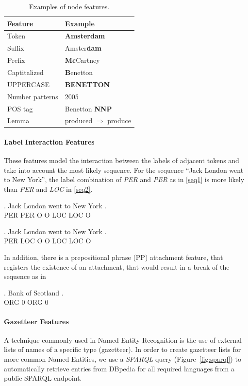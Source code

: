 \documentclass[11pt]{article}
\begin{document}
\begin{table}[h!]
\small
\begin{tabular}{ l l }
\bf Feature & \bf Example \\
\hline
Token &  \textbf{Amsterdam}\\
Suffix& Amster\textbf{dam}\\
Prefix&  \textbf{Mc}Cartney\\
Captitalized& \textbf{B}enetton\\
UPPERCASE &  \textbf{BENETTON}\\
Number patterns & 2005\\
POS tag &  Benetton \textbf{NNP}   \\
Lemma & produced $\Rightarrow$ produce \\

\end{tabular}


\caption{\normalsize Examples of node features.}
\label{table:node}
\end{table}

\paragraph*{Label Interaction Features}
These features model the interaction between the labels of adjacent tokens and take into account the most likely sequence. 
For the sequence ``Jack London went to New York'', the label combination of \emph{PER} and \emph{PER} as in \ref{seq1} is more likely than \emph{PER} and \emph{LOC} in \ref{seq2}.

\exg. Jack London went to New York .\\
      PER   PER   O    O  LOC LOC  O \\\label{seq1}

\exg. Jack London went to New York . \\ 
      PER  LOC    O    O  LOC LOC O \\\label{seq2}
      
In addition, there is a prepositional phrase (PP) attachment feature, that registers the existence of an attachment, that would
result in a break of the sequence as in

\exg. Bank of Scotland . \\ 
      ORG   0    ORG   0  \\\label{seq3}
    

\paragraph*{Gazetteer Features}
A technique commonly used in Named Entity Recognition is the use of external lists of names of a specific type (gazetteer). 
In order to create gazetteer lists for more common Named Entities, we use a \emph{SPARQL} query  (Figure~\ref{fig:sparql}) 
to automatically retrieve entries from DBpedia for all required languages from a public SPARQL endpoint.
\end{document}
